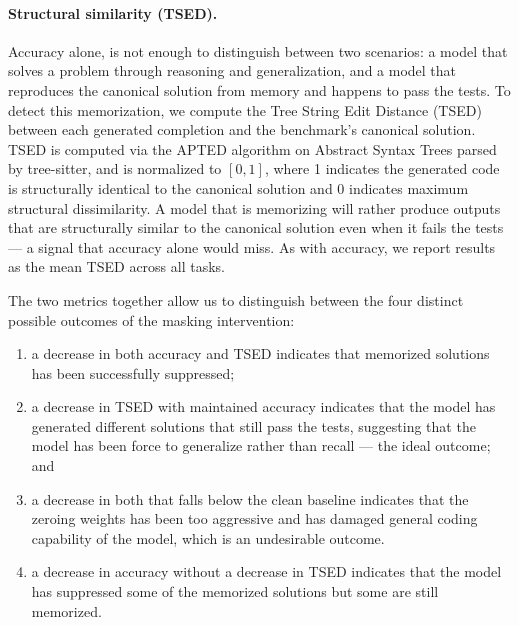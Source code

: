 \documentclass[mscthesis]{usiinfthesis}
\begin{document}
\paragraph{Structural similarity (TSED).}
Accuracy alone, is not enough to distinguish between two scenarios: a model that solves a problem through reasoning and generalization, and a model that reproduces the canonical solution from memory and happens to pass the tests.
To detect this memorization, we compute the Tree String Edit Distance (TSED) between each generated completion and the benchmark's canonical solution.
TSED is computed via the APTED algorithm on Abstract Syntax Trees parsed by tree-sitter, and is normalized to $[0, 1]$,
where 1 indicates the generated code is structurally identical to the canonical solution and 0 indicates maximum structural dissimilarity.
A model that is memorizing will rather produce outputs that are structurally similar to the canonical solution even when it fails the tests --- a signal that accuracy alone would miss.
As with accuracy, we report results as the mean TSED across all tasks.
\par\vspace{1em}
The two metrics together allow us to distinguish between the four distinct possible outcomes of the masking intervention:
\begin{enumerate}
	\item[(1)] a decrease in both accuracy and TSED indicates that memorized solutions has been successfully suppressed;
	\item[(2)] a decrease in TSED with maintained accuracy indicates that the model has generated different solutions that still pass the tests, suggesting that the model has been force to generalize rather than recall --- the ideal outcome; and
	\item[(3)] a decrease in both that falls below the clean baseline indicates that the zeroing weights has been too aggressive and has damaged general coding capability of the model, which is an undesirable outcome.
	\item[(4)] a decrease in accuracy without a decrease in TSED indicates that the model has suppressed some of the memorized solutions but some are still memorized. 
\end{enumerate}
\end{document}
